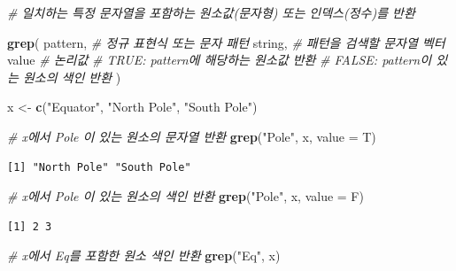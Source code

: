 \documentclass[
  11pt,
]{krantz}
\newenvironment{Shaded}{\begin{snugshade}}{\end{snugshade}}
\newcommand{\CommentTok}[1]{\textcolor[rgb]{0.37,0.37,0.37}{\textit{#1}}}
\newcommand{\DataTypeTok}[1]{\textcolor[rgb]{0.27,0.27,0.27}{#1}}
\newcommand{\KeywordTok}[1]{\textcolor[rgb]{0.27,0.27,0.27}{\textbf{#1}}}
\newcommand{\NormalTok}[1]{#1}
\newcommand{\StringTok}[1]{\textcolor[rgb]{0.5,0.5,0.5}{#1}}
\begin{document}
\footnotesize

\begin{Shaded}
\begin{Highlighting}[]
\CommentTok{# 일치하는 특정 문자열을 포함하는 원소값(문자형) 또는 인덱스(정수)를 반환}

\KeywordTok{grep}\NormalTok{(}
\NormalTok{  pattern, }\CommentTok{# 정규 표현식 또는 문자 패턴}
\NormalTok{  string,  }\CommentTok{# 패턴을 검색할 문자열 벡터}
\NormalTok{  value    }\CommentTok{# 논리값 }
           \CommentTok{# TRUE: pattern에 해당하는 원소값 반환}
           \CommentTok{# FALSE: pattern이 있는 원소의 색인 반환}
\NormalTok{)}
\end{Highlighting}
\end{Shaded}

\normalsize

\footnotesize

\begin{Shaded}
\begin{Highlighting}[]
\NormalTok{x <-}\StringTok{ }\KeywordTok{c}\NormalTok{(}\StringTok{"Equator"}\NormalTok{, }\StringTok{"North Pole"}\NormalTok{, }\StringTok{"South Pole"}\NormalTok{)}

\CommentTok{# x에서 Pole 이 있는 원소의 문자열 반환}
\KeywordTok{grep}\NormalTok{(}\StringTok{"Pole"}\NormalTok{, x, }\DataTypeTok{value =}\NormalTok{ T)}
\end{Highlighting}
\end{Shaded}

\begin{verbatim}
[1] "North Pole" "South Pole"
\end{verbatim}

\begin{Shaded}
\begin{Highlighting}[]
\CommentTok{# x에서 Pole 이 있는 원소의 색인 반환}
\KeywordTok{grep}\NormalTok{(}\StringTok{"Pole"}\NormalTok{, x, }\DataTypeTok{value =}\NormalTok{ F)}
\end{Highlighting}
\end{Shaded}

\begin{verbatim}
[1] 2 3
\end{verbatim}

\begin{Shaded}
\begin{Highlighting}[]
\CommentTok{# x에서 Eq를 포함한 원소 색인 반환}
\KeywordTok{grep}\NormalTok{(}\StringTok{"Eq"}\NormalTok{, x)}
\end{Highlighting}
\end{Shaded}
\end{document}
